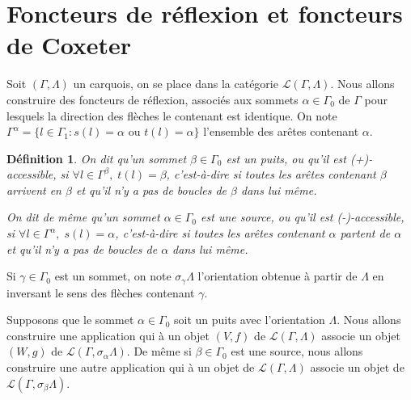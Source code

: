 \documentclass[a4paper,11pt]{article}
\newtheorem{defi}[thm]{Définition}%
\begin{document}
\section{Foncteurs de réflexion et foncteurs de Coxeter}
Soit $(\Gamma,\Lambda)$ un carquois, on se place dans la catégorie $\mathscr{L}(\Gamma,\Lambda)$. Nous allons construire des foncteurs de réflexion, associés aux sommets $\alpha \in \Gamma_{0}$ de $\Gamma$ pour lesquels la direction des flèches le contenant est identique. On note $\Gamma^{\alpha}=\{ l\in \Gamma_{1} : s(l)=\alpha\text{ ou }t(l)=\alpha\}$ l'ensemble des arêtes contenant $\alpha$.

\begin{defi}
	On dit qu'un sommet $\beta \in \Gamma_{0}$ est un \emph{puits}, ou qu'il est (+)-accessible, si $\forall l \in \Gamma^{\beta},\; t(l)=\beta$, c'est-à-dire si toutes les arêtes contenant $\beta$ arrivent en $\beta$ et qu'il n'y a pas de boucles de $\beta$ dans lui même.

	On dit de même qu'un sommet $\alpha \in \Gamma_{0}$ est une \emph{source}, ou qu'il est (-)-accessible, si $\forall l \in \Gamma^{\alpha},\; s(l)=\alpha$, c'est-à-dire si toutes les arêtes contenant $\alpha$ partent de $\alpha$ et qu'il n'y a pas de boucles de $\alpha$ dans lui même.
\end{defi}


Si $\gamma \in \Gamma_0$ est un sommet, on note $\sigma_{\gamma}\Lambda$ l'orientation obtenue à partir de $\Lambda$ en inversant le sens des flèches contenant $\gamma$.

Supposons que le sommet $\alpha \in \Gamma_{0}$ soit un puits avec l'orientation $\Lambda$.  Nous allons construire une application qui à un objet $(V,f)$ de $\mathscr{L}(\Gamma,\Lambda)$ associe un objet $(W,g)$ de $\mathscr{L}(\Gamma,\sigma_{\alpha}\Lambda)$. De même si $\beta \in \Gamma_0$ est une source, nous allons construire une autre application qui à un objet de $\mathscr L(\Gamma,\Lambda)$ associe un objet de $\mathscr L(\Gamma,\sigma_{\beta}\Lambda)$. 
\end{document}
